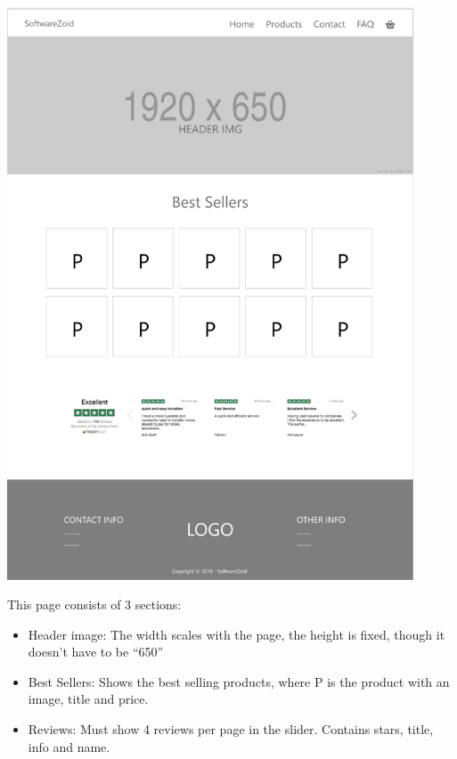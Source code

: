 \documentclass[11pt]{report}
\begin{document}
\begin{center}
\includegraphics[height=17cm]{page1}
\end{center}
\noindent This page consists of 3 sections:
\begin{itemize}[topsep=0pt, partopsep=0pt]
  \item Header image: The width scales with the page, the height is fixed, though it doesn’t have to be “650”
  \item Best Sellers: Shows the best selling products, where P is the product with an image, title and price.
  \item Reviews: Must show 4 reviews per page in the slider. Contains stars, title, info and name.
\end{itemize}
\end{document}
